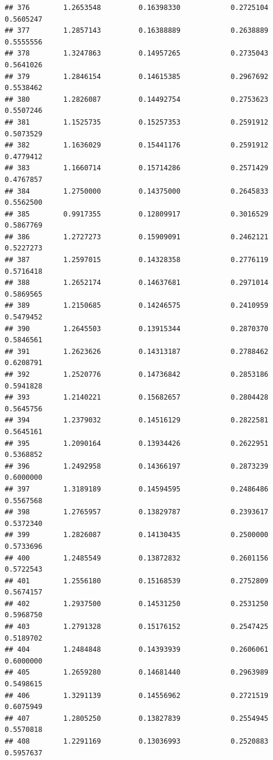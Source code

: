 \documentclass[]{article}
\begin{document}
\begin{verbatim}
## 376        1.2653548         0.16398330            0.2725104        0.5605247
## 377        1.2857143         0.16388889            0.2638889        0.5555556
## 378        1.3247863         0.14957265            0.2735043        0.5641026
## 379        1.2846154         0.14615385            0.2967692        0.5538462
## 380        1.2826087         0.14492754            0.2753623        0.5507246
## 381        1.1525735         0.15257353            0.2591912        0.5073529
## 382        1.1636029         0.15441176            0.2591912        0.4779412
## 383        1.1660714         0.15714286            0.2571429        0.4767857
## 384        1.2750000         0.14375000            0.2645833        0.5562500
## 385        0.9917355         0.12809917            0.3016529        0.5867769
## 386        1.2727273         0.15909091            0.2462121        0.5227273
## 387        1.2597015         0.14328358            0.2776119        0.5716418
## 388        1.2652174         0.14637681            0.2971014        0.5869565
## 389        1.2150685         0.14246575            0.2410959        0.5479452
## 390        1.2645503         0.13915344            0.2870370        0.5846561
## 391        1.2623626         0.14313187            0.2788462        0.6208791
## 392        1.2520776         0.14736842            0.2853186        0.5941828
## 393        1.2140221         0.15682657            0.2804428        0.5645756
## 394        1.2379032         0.14516129            0.2822581        0.5645161
## 395        1.2090164         0.13934426            0.2622951        0.5368852
## 396        1.2492958         0.14366197            0.2873239        0.6000000
## 397        1.3189189         0.14594595            0.2486486        0.5567568
## 398        1.2765957         0.13829787            0.2393617        0.5372340
## 399        1.2826087         0.14130435            0.2500000        0.5733696
## 400        1.2485549         0.13872832            0.2601156        0.5722543
## 401        1.2556180         0.15168539            0.2752809        0.5674157
## 402        1.2937500         0.14531250            0.2531250        0.5968750
## 403        1.2791328         0.15176152            0.2547425        0.5189702
## 404        1.2484848         0.14393939            0.2606061        0.6000000
## 405        1.2659280         0.14681440            0.2963989        0.5498615
## 406        1.3291139         0.14556962            0.2721519        0.6075949
## 407        1.2805250         0.13827839            0.2554945        0.5570818
## 408        1.2291169         0.13036993            0.2520883        0.5957637

\end{verbatim}
\end{document}

